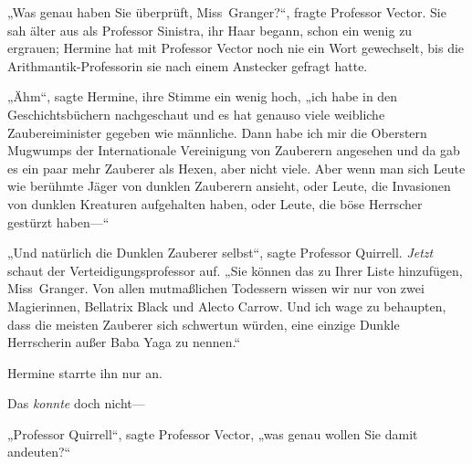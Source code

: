 „Was genau haben Sie überprüft, Miss~Granger?“, fragte Professor Vector. Sie sah älter aus als Professor Sinistra, ihr Haar begann, schon ein wenig zu ergrauen; Hermine hat mit Professor Vector noch nie ein Wort gewechselt, bis die Arithmantik-Professorin sie nach einem Anstecker gefragt hatte.

„Ähm“, sagte Hermine, ihre Stimme ein wenig hoch, „ich habe in den Geschichtsbüchern nachgeschaut und es hat genauso viele weibliche Zaubereiminister gegeben wie männliche. Dann habe ich mir die Oberstern Mugwumps der Internationale Vereinigung von Zauberern angesehen und da gab es ein paar mehr Zauberer als Hexen, aber nicht viele. Aber wenn man sich Leute wie berühmte Jäger von dunklen Zauberern ansieht, oder Leute, die Invasionen von dunklen Kreaturen aufgehalten haben, oder Leute, die böse Herrscher gestürzt haben—“

„Und natürlich die Dunklen Zauberer selbst“, sagte Professor Quirrell. \emph{Jetzt} schaut der Verteidigungsprofessor auf.
„Sie können das zu Ihrer Liste hinzufügen, Miss~Granger. Von allen mutmaßlichen Todessern wissen wir nur von zwei Magierinnen, Bellatrix Black und Alecto Carrow. Und ich wage zu behaupten, dass die meisten Zauberer sich schwertun würden, eine einzige Dunkle Herrscherin außer Baba Yaga zu nennen.“

Hermine starrte ihn nur an.

Das \emph{konnte} doch nicht—

„Professor Quirrell“, sagte Professor Vector, „was genau wollen Sie damit andeuten?“

